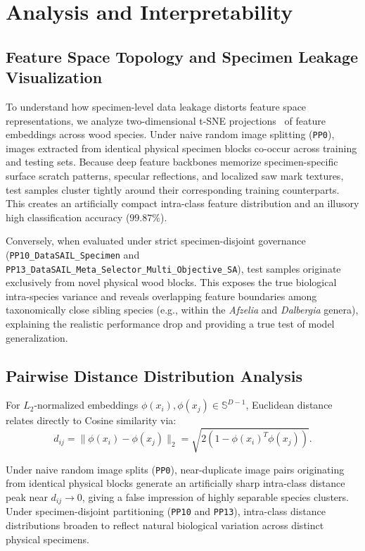 \section{Analysis and Interpretability}

\subsection{Feature Space Topology and Specimen Leakage Visualization}
To understand how specimen-level data leakage distorts feature space representations, we analyze two-dimensional t-SNE projections~\cite{tsne} of feature embeddings across wood species. Under naive random image splitting (\texttt{PP0}), images extracted from identical physical specimen blocks co-occur across training and testing sets. Because deep feature backbones memorize specimen-specific surface scratch patterns, specular reflections, and localized saw mark textures, test samples cluster tightly around their corresponding training counterparts. This creates an artificially compact intra-class feature distribution and an illusory high classification accuracy ($99.87\%$).

Conversely, when evaluated under strict specimen-disjoint governance (\texttt{PP10\_DataSAIL\_Specimen} and \texttt{PP13\_DataSAIL\_Meta\_Selector\_Multi\_Objective\_SA}), test samples originate exclusively from novel physical wood blocks. This exposes the true biological intra-species variance and reveals overlapping feature boundaries among taxonomically close sibling species (e.g., within the \textit{Afzelia} and \textit{Dalbergia} genera), explaining the realistic performance drop and providing a true test of model generalization.

\subsection{Pairwise Distance Distribution Analysis}
For $L_2$-normalized embeddings $\phi(x_i), \phi(x_j) \in \mathbb{S}^{D-1}$, Euclidean distance relates directly to Cosine similarity via:
\begin{equation}
d_{ij} = \|\phi(x_i) - \phi(x_j)\|_2 = \sqrt{2(1 - \phi(x_i)^T \phi(x_j))}.
\end{equation}

Under naive random image splits (\texttt{PP0}), near-duplicate image pairs originating from identical physical blocks generate an artificially sharp intra-class distance peak near $d_{ij} \to 0$, giving a false impression of highly separable species clusters. Under specimen-disjoint partitioning (\texttt{PP10} and \texttt{PP13}), intra-class distance distributions broaden to reflect natural biological variation across distinct physical specimens.

